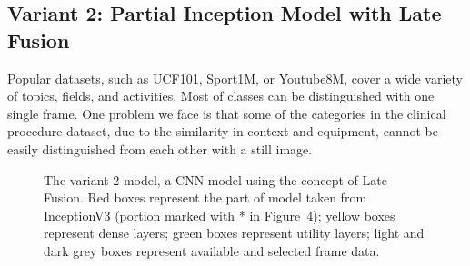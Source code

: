 \documentclass[letterpaper, 10 pt, conference]{ieeeconf}  %
\begin{document}


\subsection{Variant 2: Partial Inception Model with Late Fusion}\label{sec:variant2}
Popular datasets,  such as UCF101, Sport1M, or Youtube8M, cover a wide variety of topics, fields, and activities. Most of classes can be distinguished with one single frame. One problem we face is that some of the categories in the clinical procedure dataset, due to the similarity in context and equipment, cannot be easily distinguished from each other with a still image. 

 \begin{figure}[!htb]
        \caption{\label{fig: Illustration of Late Fusion} 
        The variant 2 model, a CNN model using the concept of Late Fusion.  Red boxes represent the part of model taken from InceptionV3 (portion marked with * in Figure~4); yellow boxes represent dense layers;  green boxes represent utility layers; light and dark grey boxes represent available and selected frame data.}
      \end{figure}
\end{document}
